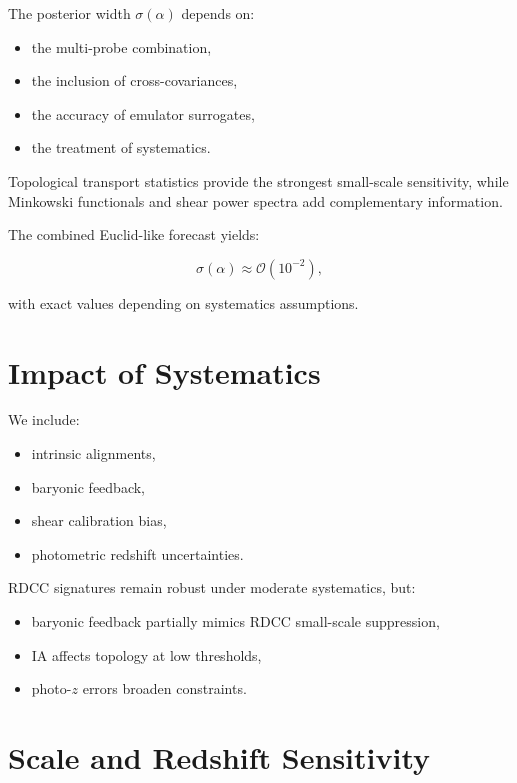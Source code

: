 \documentclass[11pt,a4paper]{article}
\begin{document}
The posterior width $\sigma(\alpha)$ depends on:

\begin{itemize}
    \item the multi-probe combination,
    \item the inclusion of cross-covariances,
    \item the accuracy of emulator surrogates,
    \item the treatment of systematics.
\end{itemize}

Topological transport statistics provide the strongest small-scale sensitivity, 
while Minkowski functionals and shear power spectra add complementary 
information.

The combined Euclid-like forecast yields:



\[
    \sigma(\alpha) \approx \mathcal{O}(10^{-2}),
\]



with exact values depending on systematics assumptions.
\section{Impact of Systematics}

We include:

\begin{itemize}
    \item intrinsic alignments,
    \item baryonic feedback,
    \item shear calibration bias,
    \item photometric redshift uncertainties.
\end{itemize}

RDCC signatures remain robust under moderate systematics, but:

\begin{itemize}
    \item baryonic feedback partially mimics RDCC small-scale suppression,
    \item IA affects topology at low thresholds,
    \item photo-$z$ errors broaden constraints.
\end{itemize}
\section{Scale and Redshift Sensitivity}
\end{document}
